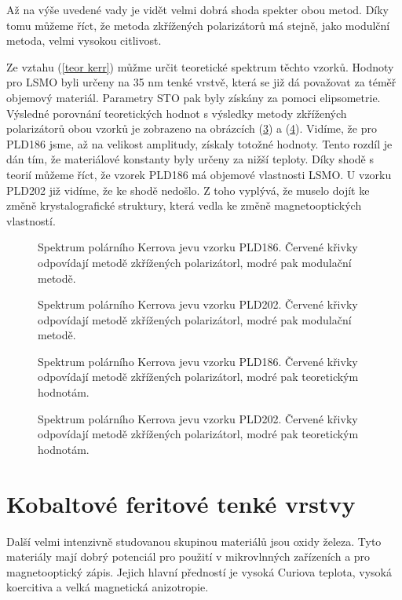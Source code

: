 Až na výše uvedené vady je vidět velmi dobrá shoda spekter obou metod. Díky tomu můžeme říct, že metoda zkřížených polarizátorů má stejně, jako modulční metoda, velmi 
vysokou citlivost.

Ze vztahu (\ref{teor kerr}) můžme určit teoretické spektrum těchto vzorků. Hodnoty pro LSMO byli určeny na 35 nm tenké vrstvě, která 
se již dá považovat za téměř objemový materiál.  Parametry STO pak byly získány za pomoci elipsometrie. Výsledné porovnání 
teoretických hodnot s výsledky metody zkřížených polarizátorů obou 
vzorků je zobrazeno na obrázcích (\ref{sPLD186t}) a (\ref{sPLD202t}). Vidíme, že pro PLD186 jsme, až na velikost amplitudy, získaly totožné hodnoty. 
Tento rozdíl je dán tím, že materiálové konstanty byly určeny za nižší teploty. Díky shodě s teorií můžeme říct, že vzorek PLD186 má objemové vlastnosti LSMO. 
U vzorku PLD202 již vidíme, že ke shodě nedošlo. Z toho vyplývá, že muselo dojít ke změně krystalografické struktury, která vedla ke změně magnetooptických vlastností.

\begin{figure}

\caption{Spektrum polárního Kerrova jevu vzorku PLD186. Červené křivky odpovídají metodě zkřížených polarizátorl, modré pak modulační metodě.}
\label{sPLD186}
\end{figure}

\begin{figure}

\caption{Spektrum polárního Kerrova jevu vzorku PLD202. Červené křivky odpovídají metodě zkřížených polarizátorl, modré pak modulační metodě.}
\label{sPLD202}
\end{figure}

\begin{figure}

\caption{Spektrum polárního Kerrova jevu vzorku PLD186. Červené křivky odpovídají metodě zkřížených polarizátorl, modré pak teoretickým hodnotám.}
\label{sPLD186t}
\end{figure}

\begin{figure}

\caption{Spektrum polárního Kerrova jevu vzorku PLD202. Červené křivky odpovídají metodě zkřížených polarizátorl, modré pak teoretickým hodnotám.}
\label{sPLD202t}
\end{figure}
\section{Kobaltové feritové tenké vrstvy}
Další velmi intenzivně studovanou skupinou materiálů jsou oxidy železa.
Tyto materiály mají dobrý potenciál pro použití v mikrovlnných zařízeních a  pro magnetooptický zápis. 
Jejich hlavní předností je vysoká Curiova teplota, vysoká koercitiva a velká magnetická anizotropie. 

